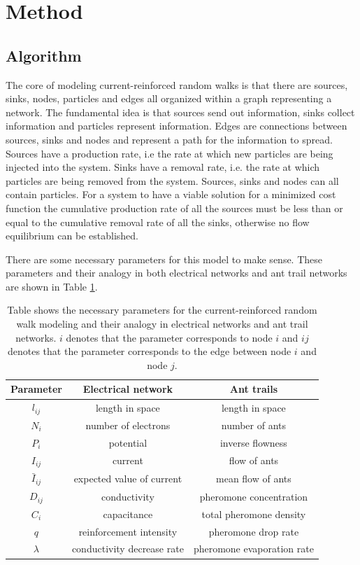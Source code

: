 \section{Method}
\label{sec:method}
\subsection{Algorithm}
The core of modeling current-reinforced random walks is that there are sources, sinks, nodes, particles and edges all organized within a graph representing a network. The fundamental idea is that sources send out information, sinks collect information and particles represent information. Edges are connections between sources, sinks and nodes and represent a path for the information to spread. Sources have a production rate, i.e the rate at which new particles are being injected into the system. Sinks have a removal rate, i.e. the rate at which particles are being removed from the system. Sources, sinks and nodes can all contain particles. For a system to have a viable solution for a minimized cost function the cumulative production rate of all the sources must be less than or equal to the cumulative removal rate of all the sinks, otherwise no flow equilibrium can be established.

There are some necessary parameters for this model to make sense. These parameters and their analogy in both electrical networks and ant trail networks are shown in Table \ref{tab:parameters}.

\begin{table}[H]
\renewcommand{\arraystretch}{1.2}
\centering
\caption{Table shows the necessary parameters for the current-reinforced random walk modeling and their analogy in electrical networks and ant trail networks. $i$ denotes that the parameter corresponds to node $i$ and $ij$ denotes that the parameter corresponds to the edge between node $i$ and node $j$.}
\label{tab:parameters}
\begin{tabular}{ c | c | c }                       
	\textbf{Parameter} & \textbf{Electrical network} & \textbf{Ant trails} \\
	\hline
	$l_{ij}$ & length in space & length in space \\
	\hline
	$N_{i}$ & number of electrons & number of ants \\
	\hline	
	$P_{i}$ & potential & inverse flowness \\
	\hline
	$I_{ij}$ & current & flow of ants \\
	\hline
	$\bar{I}_{ij}$ & expected value of current & mean flow of ants \\
	\hline
	$D_{ij}$ & conductivity & pheromone concentration \\
	\hline
	$C_{i}$ & capacitance & total pheromone density \\
	\hline
	$q$ & reinforcement intensity & pheromone drop rate \\
	\hline
	$\lambda$ & conductivity decrease rate & pheromone evaporation rate \\
\end{tabular} 
\end{table}

